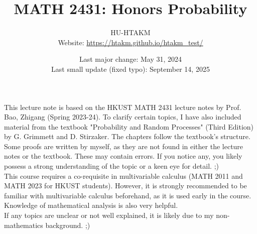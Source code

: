 \documentclass{huhtakm-template-book}
\title{MATH 2431: Honors Probability}
\author{
	HU-HTAKM\\
	Website: \url{https://htakm.github.io/htakm_test/}
}
\date{
	Last major change: May 31, 2024\\
	Last small update (fixed typo): September 14, 2025
}
\begin{document}
\maketitle
This lecture note is based on the HKUST MATH 2431 lecture notes by Prof. Bao, Zhigang (Spring 2023-24). To clarify certain topics, I have also included material from the textbook "Probability and Random Processes" (Third Edition) by G. Grimmett and D. Stirzaker. The chapters follow the textbook's structure.\\
Some proofs are written by myself, as they are not found in either the lecture notes or the textbook. These may contain errors. If you notice any, you likely possess a strong understanding of the topic or a keen eye for detail. ;)\\
This course requires a co-requisite in multivariable calculus (MATH 2011 and MATH 2023 for HKUST students). However, it is strongly recommended to be familiar with multivariable calculus beforehand, as it is used early in the course. Knowledge of mathematical analysis is also very helpful.\\
If any topics are unclear or not well explained, it is likely due to my non-mathematics background. ;)
\end{document}

